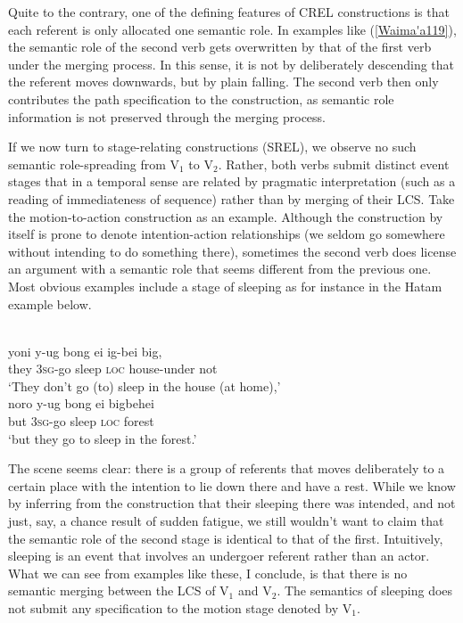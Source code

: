 Quite to the contrary, one of the defining features of CREL constructions is that each referent is only allocated one semantic role. In examples like (\ref{Waima'a119}), the semantic role of the second verb gets overwritten by that of the first verb under the merging process. In this sense, it is not by deliberately descending that the referent moves downwards, but by plain falling. The second verb then only contributes the path specification to the construction, as semantic role information is not preserved through the merging process.
 
If we now turn to stage-relating constructions (SREL), we observe no such semantic role-spreading from V$_1$ to V$_2$. Rather, both verbs submit distinct event stages that in a temporal sense are related by pragmatic interpretation (such as a reading of immediateness of sequence) rather than by merging of their LCS. Take the motion-to-action construction as an example. Although the construction by itself is prone to denote intention-action relationships (we seldom go somewhere without intending to do something there), sometimes the second verb does license an argument with a semantic role that seems different from the previous one. Most obvious examples include a stage of sleeping as for instance in the Hatam example below.

\ea \label{Hatam6465}
\\
\ea
\gll yoni y-ug bong ei ig-bei big, \\
they \textsc{3}\textsc{sg}-go sleep \textsc{loc} house-under not \\
\glft `They don't go (to) sleep in the house (at home),' \\ 
\ex
\gll noro y-ug bong ei bigbehei \\ 
but \textsc{3}\textsc{sg}-go sleep \textsc{loc} forest \\
\glft `but they go to sleep in the forest.' \\ 
\z
\z

The scene seems clear: there is a group of referents that moves deliberately to a certain place with the intention to lie down there and have a rest. While we know by inferring from the construction that their sleeping there was intended, and not just, say, a chance result of sudden fatigue, we still wouldn't want to claim that the semantic role of the second stage is identical to that of the first. Intuitively, sleeping is an event that involves an undergoer referent rather than an actor. What we can see from examples like these, I conclude, is that there is no semantic merging between the LCS of V$_1$ and V$_2$. The semantics of sleeping does not submit any specification to the motion stage denoted by V$_1$.


